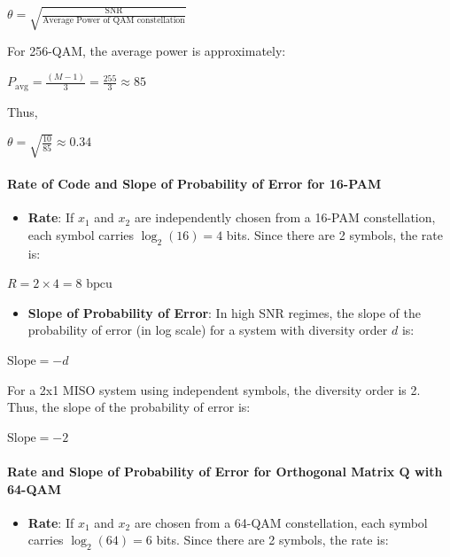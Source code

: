 \documentclass[11pt]{article}
\providecommand{\tightlist}{%
      \setlength{\itemsep}{0pt}\setlength{\parskip}{0pt}}
\begin{document}
\(\theta = \sqrt{\frac{\text{SNR}}{\text{Average Power of QAM constellation}}}\)

For 256-QAM, the average power is approximately:

\(P_{\text{avg}} = \frac{(M-1)}{3} = \frac{255}{3} \approx 85\)

Thus,

\(\theta = \sqrt{\frac{10}{85}} \approx 0.34\)

\paragraph{Rate of Code and Slope of Probability of Error for
16-PAM}\label{rate-of-code-and-slope-of-probability-of-error-for-16-pam}

\begin{itemize}
\tightlist
\item
  \textbf{Rate}: If \(x_1\) and \(x_2\) are independently chosen from a
  16-PAM constellation, each symbol carries \(\log_2(16) = 4\) bits.
  Since there are 2 symbols, the rate is:
\end{itemize}

\(R = 2 \times 4 = 8 \text{ bpcu}\)

\begin{itemize}
\tightlist
\item
  \textbf{Slope of Probability of Error}: In high SNR regimes, the slope
  of the probability of error (in log scale) for a system with diversity
  order \(d\) is:
\end{itemize}

\(\text{Slope} = -d\)

For a 2x1 MISO system using independent symbols, the diversity order is
2. Thus, the slope of the probability of error is:

\(\text{Slope} = -2\)

\paragraph{\texorpdfstring{Rate and Slope of Probability of Error for
Orthogonal Matrix \(\mathbf{Q}\) with
64-QAM}{Rate and Slope of Probability of Error for Orthogonal Matrix \textbackslash mathbf\{Q\} with 64-QAM}}\label{rate-and-slope-of-probability-of-error-for-orthogonal-matrix-mathbfq-with-64-qam}

\begin{itemize}
\tightlist
\item
  \textbf{Rate}: If \(x_1\) and \(x_2\) are chosen from a 64-QAM
  constellation, each symbol carries \(\log_2(64) = 6\) bits. Since
  there are 2 symbols, the rate is:
\end{itemize}
\end{document}
